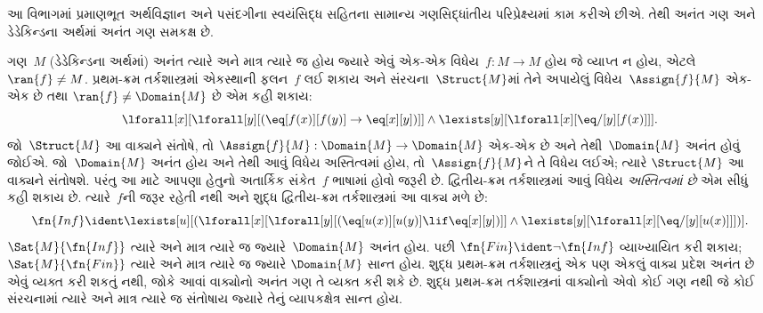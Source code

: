 \begingroup
\makeatletter{}\makeatother


\label{guunit:OLP-0329}


આ વિભાગમાં પ્રમાણભૂત અર્થવિજ્ઞાન અને પસંદગીના સ્વયંસિદ્ધ સહિતના
સામાન્ય ગણસિદ્ધાંતીય પરિપ્રેક્ષ્યમાં કામ કરીએ છીએ. તેથી અનંત ગણ
અને ડેડેકિન્ડના અર્થમાં અનંત ગણ સમકક્ષ છે.

ગણ~$M$ (ડેડેકિન્ડના અર્થમાં) અનંત ત્યારે અને માત્ર ત્યારે જ હોય જ્યારે
એવું એક-એક વિધેય~$f\colon M
\to M$ હોય જે વ્યાપ્ત ન હોય, એટલે $\ran{f} \neq M$. પ્રથમ-ક્રમ
તર્કશાસ્ત્રમાં એકસ્થાની ફલન~$f$ લઈ શકાય અને
સંરચના~$\Struct{M}$માં તેને અપાયેલું વિધેય~$\Assign{f}{M}$
એક-એક છે તથા $\ran{f} \neq
\Domain{M}$ છે એમ કહી શકાય:
\[
\lforall[x][\lforall[y][(\eq[f(x)][f(y)] \to \eq[x][y])]] \land
\lexists[y][\lforall[x][\eq/[y][f(x)]]].
\]
જો~$\Struct{M}$ આ વાક્યને સંતોષે, તો
$\Assign{f}{M}:
\Domain{M} \to \Domain{M}$ એક-એક છે અને તેથી~$\Domain{M}$
અનંત હોવું જોઈએ. જો~$\Domain{M}$ અનંત હોય અને તેથી આવું વિધેય
અસ્તિત્વમાં હોય, તો~$\Assign{f}{M}$ને તે વિધેય લઈએ; ત્યારે
$\Struct{M}$ આ વાક્યને સંતોષશે. પરંતુ આ માટે આપણા હેતુનો
અતાર્કિક સંકેત~$f$ ભાષામાં હોવો જરૂરી છે. દ્વિતીય-ક્રમ તર્કશાસ્ત્રમાં
આવું વિધેય \emph{અસ્તિત્વમાં છે} એમ સીધું કહી શકાય છે. ત્યારે~$f$ની
જરૂર રહેતી નથી અને શુદ્ધ દ્વિતીય-ક્રમ તર્કશાસ્ત્રમાં આ વાક્ય
મળે છે:
\[
\fn{Inf} \ident \lexists[u][(\lforall[x][\lforall[y][(\eq[u(x)][u(y)]
      \lif \eq[x][y])]] \land \lexists[y][\lforall[x][\eq/[y][u(x)]]])].
\]
$\Sat{M}{\fn{Inf}}$ ત્યારે અને માત્ર ત્યારે જ જ્યારે~$\Domain{M}$
અનંત હોય. પછી $\fn{Fin} \ident \lnot \fn{Inf}$ વ્યાખ્યાયિત કરી
શકાય; $\Sat{M}{\fn{Fin}}$ ત્યારે અને માત્ર ત્યારે જ જ્યારે
$\Domain{M}$ સાન્ત હોય. શુદ્ધ પ્રથમ-ક્રમ તર્કશાસ્ત્રનું એક પણ એકલું
વાક્ય પ્રદેશ અનંત છે એવું વ્યક્ત કરી શકતું નથી, જોકે
આવાં વાક્યોનો અનંત ગણ તે વ્યક્ત કરી શકે છે. શુદ્ધ પ્રથમ-ક્રમ
તર્કશાસ્ત્રનાં વાક્યોનો એવો કોઈ ગણ નથી જે કોઈ
સંરચનામાં ત્યારે અને માત્ર ત્યારે જ સંતોષાય જ્યારે તેનું
વ્યાપકક્ષેત્ર સાન્ત હોય.


